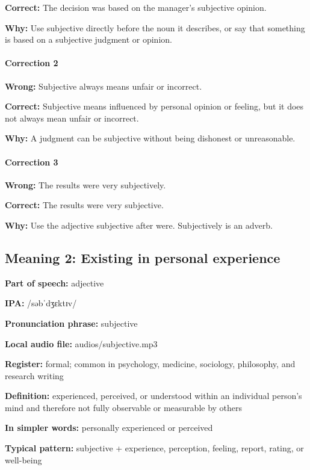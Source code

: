 \documentclass[11pt]{article}
\begin{document}
\textbf{Correct:} The decision was based on the manager's subjective opinion.

\textbf{Why:} Use subjective directly before the noun it describes, or say that something is based on a subjective judgment or opinion.

\paragraph{Correction 2}
\textbf{Wrong:} Subjective always means unfair or incorrect.

\textbf{Correct:} Subjective means influenced by personal opinion or feeling, but it does not always mean unfair or incorrect.

\textbf{Why:} A judgment can be subjective without being dishonest or unreasonable.

\paragraph{Correction 3}
\textbf{Wrong:} The results were very subjectively.

\textbf{Correct:} The results were very subjective.

\textbf{Why:} Use the adjective subjective after were. Subjectively is an adverb.

\subsection{Meaning 2: Existing in personal experience}
\textbf{Part of speech:} adjective

\textbf{IPA:} /səbˈdʒɛktɪv/

\textbf{Pronunciation phrase:} subjective

\textbf{Local audio file:} audios/subjective.mp3

\textbf{Register:} formal; common in psychology, medicine, sociology, philosophy, and research writing

\textbf{Definition:} experienced, perceived, or understood within an individual person's mind and therefore not fully observable or measurable by others

\textbf{In simpler words:} personally experienced or perceived

\textbf{Typical pattern:} subjective + experience, perception, feeling, report, rating, or well-being
\end{document}

